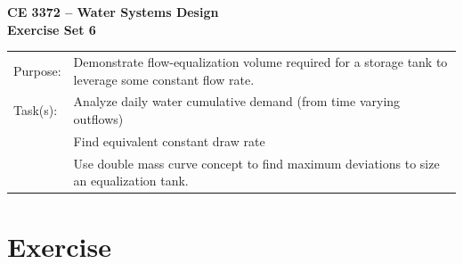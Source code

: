 \documentclass[12pt]{article}
\begin{document}
\begin{center}
{\textbf{{ CE 3372 -- Water Systems Design} \\ {Exercise Set 6}}}
\end{center}
\begingroup
\begin{tabular}{p{1in} p{5in}}
Purpose: & Demonstrate flow-equalization volume required for a storage tank to leverage some constant flow rate.\\
Task(s): & Analyze daily water cumulative demand (from time varying outflows) \\
~ & Find equivalent constant draw rate \\
~ &  Use double mass curve concept to find maximum deviations to size an equalization tank.\\
\end{tabular}
\endgroup
\section*{\small{Exercise}}
\end{document}
